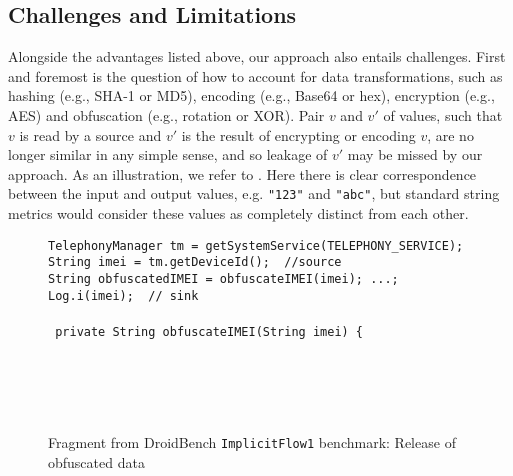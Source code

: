 \subsection{Challenges and Limitations}\label{Se:limitations}

Alongside the advantages listed above, our approach also entails challenges. First and foremost is the question of how to account for data transformations, such as hashing (e.g., SHA-1 or MD5), encoding (e.g., Base64 or hex), encryption (e.g., AES) and obfuscation (e.g., rotation or XOR).
Pair $v$ and $v'$ of values, such that $v$ is read by a source and $v'$ is the result of encrypting or encoding $v$, are no longer similar in any simple sense, and so leakage of $v'$ may be missed by our approach. As an illustration, we refer to . Here there is clear correspondence between the input and output values, e.g. {\tt "123"} and {\tt "abc"}, but standard string metrics would consider these values as completely distinct from each other.

\begin{figure}
\begin{small}
{\tt TelephonyManager tm = getSystemService(TELEPHONY\_SERVICE);} \\
{\tt String imei = tm.getDeviceId(); {\color{green} //source}} \\
{\tt String obfuscatedIMEI = obfuscateIMEI(imei); ...;} \\
{\tt Log.i(imei); {\color{green} // sink}} \\
{\tt } \\
{\tt {\color{purple} private} String obfuscateIMEI(String imei) \{} \\
 \\
 \\
 \\
 \\
\end{small}
\caption{\label{Fi:dataTransform} Fragment from DroidBench {\tt ImplicitFlow1} benchmark: Release of obfuscated data}
\end{figure}

